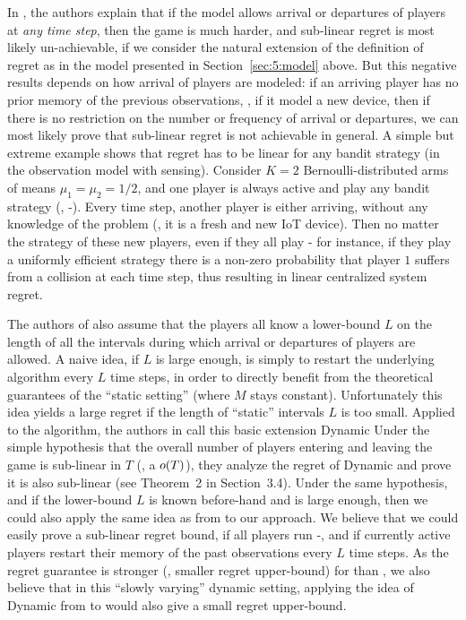 In \cite{Rosenski16}, the authors explain that if the model allows arrival or departures of players at \emph{any time step}, then the game is much harder, and sub-linear regret is most likely un-achievable, if we consider the natural extension of the definition of regret as in the model presented in Section~\ref{sec:5:model} above.
But this negative results depends on how arrival of players are modeled:
if an arriving player has no prior memory of the previous observations, \ie, if it model a new device, then if there is no restriction on the number or frequency of arrival or departures, we can most likely prove that sub-linear regret is not achievable in general.
A simple but extreme example shows that regret has to be linear for any bandit strategy (in the observation model with sensing).
Consider $K=2$ Bernoulli-distributed arms of means $\mu_1=\mu_2=1/2$, and one player is always active and play any bandit strategy (\eg, \MCTopM-\klUCB).
Every time step, another player is either arriving, without any knowledge of the problem (\eg, it is a fresh and new IoT device). Then no matter the strategy of these new players, even if they all play \MCTopM-\klUCB{} for instance, if they play a uniformly efficient strategy there is a non-zero probability that player $1$ suffers from a collision at each time step, thus resulting in linear centralized system regret.

The authors of \cite{Rosenski16} also assume that the players all know a lower-bound $L$ on the length of all the intervals during which arrival or departures of players are allowed.
A naive idea, if $L$ is large enough, is simply to restart the underlying algorithm every $L$ time steps, in order to directly benefit from the theoretical guarantees of the ``static setting'' (where $M$ stays constant).
Unfortunately this idea yields a large regret if the length of ``static'' intervals $L$ is too small.
Applied to the \MusicalChair{} algorithm, the authors in \cite{Rosenski16} call this basic extension Dynamic \MusicalChair
Under the simple hypothesis that the overall number of players entering and leaving the game is sub-linear in $T$ (\ie, a $\mathop{}\mathopen{}o\mathopen{}\left(T\right)$), they analyze the regret of Dynamic \MusicalChair{} and prove it is also sub-linear (see Theorem~2 in Section~3.4).
%
Under the same hypothesis, and if the lower-bound $L$ is known before-hand and is large enough, then we could also apply the same idea as from \cite{Rosenski16} to our approach. We believe that we could easily prove a sub-linear regret bound, if all players run \MCTopM-\klUCB, and if currently active players restart their memory of the past observations every $L$ time steps.
As the regret guarantee is stronger (\ie, smaller regret upper-bound) for \MCTopM{} than \MusicalChair, we also believe that in this ``slowly varying'' dynamic setting, applying the idea of Dynamic \MusicalChair{} from \cite{Rosenski16} to \MCTopM{} would also give a small regret upper-bound.

